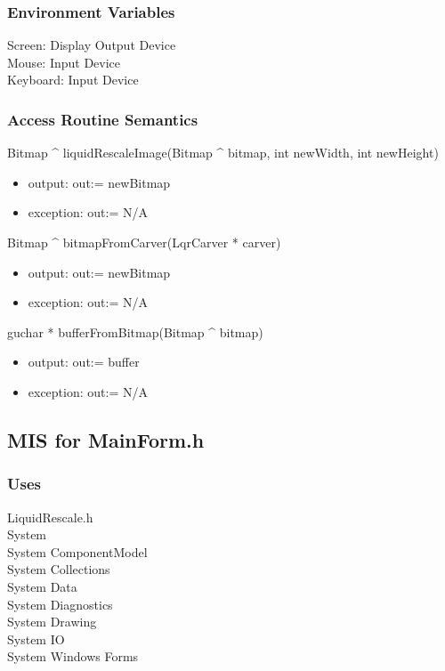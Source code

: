 \documentclass{article}
\begin{document}
\subsubsection* {Environment Variables}
Screen: Display Output Device \\
Mouse: Input Device \\
Keyboard: Input Device

\subsubsection* {Access Routine Semantics}
Bitmap \^{} liquidRescaleImage(Bitmap \^{} bitmap, int newWidth, int newHeight) \\
\begin{itemize}
    \item output: out:= newBitmap
    \item exception: out:= N/A
\end{itemize}
Bitmap \^{} bitmapFromCarver(LqrCarver * carver) \\
\begin{itemize}
    \item output: out:= newBitmap
    \item exception: out:= N/A
\end{itemize}
guchar * bufferFromBitmap(Bitmap \^{} bitmap) \\
\begin{itemize}
    \item output: out:= buffer
    \item exception: out:= N/A
\end{itemize}

\newpage

\subsection {MIS for MainForm.h}

\subsubsection* {Uses}
LiquidRescale.h \\
System \\
System ComponentModel \\
System Collections \\
System Data \\
System Diagnostics \\
System Drawing \\
System IO \\
System Windows Forms
\end{document}
